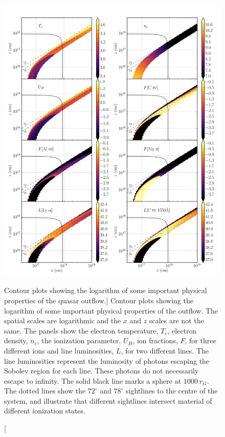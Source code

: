 \begin{figure}
\centering
\includegraphics[width=1.0\textwidth]{figures/06-agnpaper/fig2.png}
\caption
[Contour plots showing the logarithm of some important 
physical properties of the quasar outflow.]
{
Contour plots showing the logarithm of some important 
physical properties of the outflow. The spatial scales are
logarithmic and the $x$ and $z$ scales are not the same.
The panels show the electron
temperature, $T_e$, electron density, $n_e$, the ionization
parameter, $U_H$, ion fractions, $F$, for three different 
ions and line luminosities, $L$, for two different lines.
The line luminosities represent the luminosity of photons
escaping the Sobolev region for each line. These photons do not
necessarily escape to infinity.
The solid black line marks a sphere at $1000~r_G$.
The dotted lines show the $72^\circ$ and $78^\circ$ sightlines 
to the centre of the system, and illustrate that different sightlines
intersect material of different ionization states.
}
\label{fig:wind}
\end{figure}

